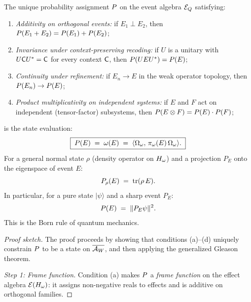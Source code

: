 \begin{theorem}
\label{thm:born-rule}
The unique probability assignment $P$ on the event algebra
$\mathcal{E}_Q$ satisfying:
\begin{enumerate}[nosep, label=(\alph*)]
  \item \emph{Additivity on orthogonal events:}
        if $E_1 \perp E_2$, then
        $P(E_1 + E_2) = P(E_1) + P(E_2)$;
  \item \emph{Invariance under context-preserving recoding:}
        if $U$ is a unitary with $U \mathsf{C} U^* = \mathsf{C}$ for
        every context $\mathsf{C}$, then $P(U E U^*) = P(E)$;
  \item \emph{Continuity under refinement:}
        if $E_n \to E$ in the weak operator topology, then
        $P(E_n) \to P(E)$;
  \item \emph{Product multiplicativity on independent systems:}
        if $E$ and $F$ act on independent (tensor-factor) subsystems,
        then $P(E \otimes F) = P(E) \cdot P(F)$;
\end{enumerate}
is the state evaluation:
\begin{equation}
\label{eq:born-rule}
  \boxed{\;
    P(E)
    \;=\; \omega(E)
    \;=\; \langle \Omega_\omega,\, \pi_\omega(E)\, \Omega_\omega \rangle.
  \;}
\end{equation}
For a general normal state $\rho$ (density operator on $H_\omega$) and
a projection $P_E$ onto the eigenspace of event $E$:
\begin{equation}
\label{eq:born-pure}
  P_\rho(E) \;=\; \mathrm{tr}(\rho\, E).
\end{equation}
In particular, for a pure state $|\psi\rangle$ and a sharp event $P_E$:
\begin{equation}
\label{eq:born-pure-proj}
  P(E) \;=\; \|P_E \psi\|^2.
\end{equation}
This is the Born rule of quantum mechanics.

\begin{proof}[Proof sketch]
The proof proceeds by showing that conditions (a)--(d) uniquely constrain
$P$ to be a state on $\overline{\mathcal{A}_W}$, and then applying the generalized
Gleason theorem.

\emph{Step 1: Frame function.}
Condition (a) makes $P$ a \emph{frame function} on the effect
algebra $\mathcal{E}(H_\omega)$: it assigns non-negative reals to effects
and is additive on orthogonal families.


\end{proof}
\end{theorem}
